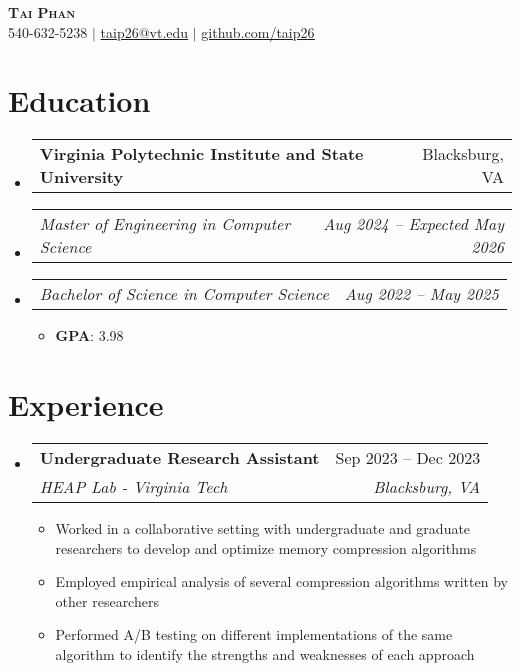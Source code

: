 \documentclass[letterpaper,11pt]{article}
\makeatletter
\newcommand{\resumeItem}[1]{
  \item\small{
    {#1 \vspace{-2pt}}
  }
}
\newcommand{\resumeSubheading}[4]{
  \vspace{-2pt}\item
    \begin{tabular*}{0.97\textwidth}[t]{l@{\extracolsep{\fill}}r}
      \textbf{#1} & #2 \\
      \textit{\small#3} & \textit{\small #4} \\
    \end{tabular*}\vspace{-7pt}
}
\newcommand{\resumeSubSubheading}[2]{
    \item
    \begin{tabular*}{0.97\textwidth}{l@{\extracolsep{\fill}}r}
      \textit{\small#1} & \textit{\small #2} \\
    \end{tabular*}\vspace{-7pt}
}
\newcommand{\resumeSubHeadingListStart}{\begin{itemize}[leftmargin=0.15in, label={}]}
\newcommand{\resumeSubHeadingListEnd}{\end{itemize}}
\newcommand{\resumeItemListStart}{\begin{itemize}}
\newcommand{\resumeItemListEnd}{\end{itemize}\vspace{-5pt}}
\newcommand{\resumeInstitution}[2]{
  \vspace{-2pt}\item
    \begin{tabular*}{0.97\textwidth}[t]{l@{\extracolsep{\fill}}r}
      \textbf{#1} & #2 \\
    \end{tabular*}\vspace{-7pt}
}
\makeatother
\begin{document}

\begin{center}
  \textbf{\Huge \scshape Tai Phan} \\ \vspace{1pt}
  \small 540-632-5238 $|$ \href{taip26@vt.edu}{taip26@vt.edu}
  $|$
  \href{https://github.com/taip26}{\underline{github.com/taip26}}
\end{center}


\section{Education}
\resumeSubHeadingListStart

  \resumeInstitution %
    {Virginia Polytechnic Institute and State University}{Blacksburg, VA}
  
  \resumeSubSubheading
    {Master of Engineering in Computer Science}{Aug 2024 -- Expected May 2026}
  
  \resumeSubSubheading
    {Bachelor of Science in Computer Science}{Aug 2022 -- May 2025}
  
  \resumeItemListStart
    \resumeItem{\textbf{GPA}: 3.98}
  \resumeItemListEnd

\resumeSubHeadingListEnd


\section{Experience}
\resumeSubHeadingListStart

\resumeSubheading
{Undergraduate Research Assistant}{Sep 2023 -- Dec 2023}
{HEAP Lab - Virginia Tech}{Blacksburg, VA}
\resumeItemListStart
\resumeItem{Worked in a collaborative setting with undergraduate and graduate researchers to develop and optimize memory compression algorithms}
\resumeItem{Employed empirical analysis of several compression algorithms written by other researchers}
\resumeItem{Performed A/B testing on different implementations of the same algorithm to identify the strengths and weaknesses of each approach}
\resumeItemListEnd
\resumeSubHeadingListEnd
\end{document}
